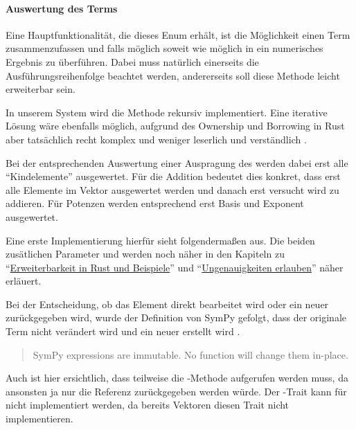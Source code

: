 \documentclass[11pt,a4paper, ngerman]{article}
\begin{document}
\paragraph{Auswertung des Terms} Eine Hauptfunktionalität, die dieses Enum erhält, ist die Möglichkeit einen Term zusammenzufassen und falls möglich soweit wie möglich in ein numerisches Ergebnis zu überführen. Dabei muss natürlich einerseits die Ausführungsreihenfolge beachtet werden, andererseits soll diese Methode leicht erweiterbar sein.

In unserem System wird die Methode rekursiv implementiert. Eine iterative Lösung wäre ebenfalls möglich, aufgrund des Ownership und Borrowing in Rust aber tatsächlich recht komplex und weniger leserlich und verständlich \cite{RustRecToItAst}.

Bei der entsprechenden Auswertung einer Auspragung des  werden dabei erst alle ``Kindelemente'' ausgewertet. Für die Addition bedeutet dies konkret, dass erst alle Elemente im Vektor ausgewertet werden und danach erst versucht wird zu addieren. Für Potenzen werden entsprechend erst Basis und Exponent ausgewertet.

Eine erste Implementierung hierfür sieht folgendermaßen aus. Die beiden zusätlichen Parameter  und  werden noch näher in den Kapiteln zu ``\hyperref[sec:kapErRustUndBei]{Erweiterbarkeit in Rust und Beispiele}'' und ``\hyperref[sec:ungenauigkeitenKapitel]{Ungenauigkeiten erlauben}'' näher erläuert.

Bei der Entscheidung, ob das Element direkt bearbeitet wird oder ein neuer  zurückgegeben wird, wurde der Definition von SymPy gefolgt, dass der originale Term nicht verändert wird und ein neuer erstellt wird \cite{SymPySubs}.

\begin{quote}
    SymPy expressions are immutable. No function will change them in-place.
\end{quote}

Auch ist hier ersichtlich, dass teilweise die -Methode aufgerufen werden muss, da ansonsten ja nur die Referenz  zurückgegeben werden würde. Der -Trait kann für  nicht implementiert werden, da bereits Vektoren diesen Trait nicht implementieren.
\end{document}
